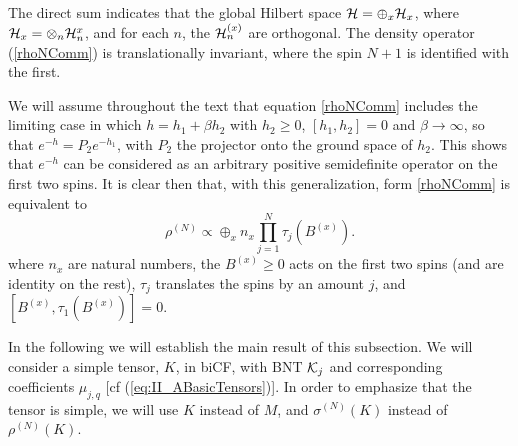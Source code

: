 \documentclass{elsarticle}
\newcommand{\be}{\begin{equation}}
\newcommand{\ee}{\end{equation}}
\begin{document}
The direct sum indicates that the global Hilbert space ${\cal H}= \oplus_x {\cal H}_x$, where
${\cal H}_x=\otimes_n {\cal H}_n^{x}$, and for each $n$, the ${\cal H}_n^{(x)}$ are orthogonal. The density operator (\ref{rhoNComm}) is translationally invariant, where the spin $N+1$ is identified with the first.

We will assume throughout the text that equation \eqref{rhoNComm} includes the limiting case in which $h=h_1+\beta h_2$ with $h_2\ge 0$, $[h_1,h_2]=0$ and $\beta\rightarrow \infty$, so that $e^{-h}=P_2e^{-h_1}$, with $P_2$ the projector onto the ground space of $h_2$. This shows that $e^{-h}$ can be considered  as an arbitrary positive semidefinite operator on the first two spins. It is clear then that, with this generalization, form \eqref{rhoNComm} is equivalent to 
 \be
 \label{rhoNCommv2}
 \rho^{(N)}\propto \oplus_{x} n_x \prod_{j=1}^N \tau_{j}(B^{(x)}).
 \ee
where $n_x$ are natural numbers, the $B^{(x)}\ge 0$ acts on the first two spins (and are identity on the rest), $\tau_j$ translates the spins by an amount $j$, and $[B^{(x)},\tau_1(B^{(x)})]=0$.

In the following we will establish the main result of this subsection. We will consider a simple tensor, $K$, in biCF, with BNT ${\cal K}_j$ and corresponding coefficients $\mu_{j,q}$ [cf (\ref{eq:II_ABasicTensors})]. In order to emphasize that the tensor is simple, we will use $K$ instead of $M$, and $\sigma^{(N)}(K)$ instead of $\rho^{(N)}(K)$.
\end{document}
